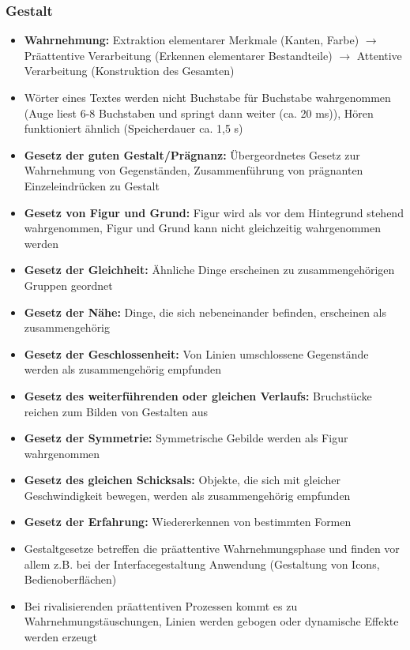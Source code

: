\documentclass[12pt,landscape]{article}
\begin{document}
\begin{multicols}{3}
\subsubsection{Gestalt}
\begin{itemize}
\item \textbf{Wahrnehmung:} Extraktion elementarer Merkmale (Kanten, Farbe) $\rightarrow$ Präattentive Verarbeitung (Erkennen elementarer Bestandteile) $\rightarrow$ Attentive Verarbeitung (Konstruktion des Gesamten)
\item Wörter eines Textes werden nicht Buchstabe für Buchstabe wahrgenommen (Auge liest 6-8 Buchstaben und springt dann weiter (ca. 20 ms)), Hören funktioniert ähnlich (Speicherdauer ca. 1,5 s)
\item \textbf{Gesetz der guten Gestalt/Prägnanz:} Übergeordnetes Gesetz zur Wahrnehmung von Gegenständen, Zusammenführung von prägnanten Einzeleindrücken zu Gestalt
\item \textbf{Gesetz von Figur und Grund:} Figur wird als vor dem Hintegrund stehend wahrgenommen, Figur und Grund kann nicht gleichzeitig wahrgenommen werden
\item \textbf{Gesetz der Gleichheit:} Ähnliche Dinge erscheinen zu zusammengehörigen Gruppen geordnet
\item \textbf{Gesetz der Nähe:} Dinge, die sich nebeneinander befinden, erscheinen als zusammengehörig
\item \textbf{Gesetz der Geschlossenheit:} Von Linien umschlossene Gegenstände werden als zusammengehörig empfunden
\item \textbf{Gesetz des weiterführenden oder gleichen Verlaufs:} Bruchstücke reichen zum Bilden von Gestalten aus
\item \textbf{Gesetz der Symmetrie:} Symmetrische Gebilde werden als Figur wahrgenommen
\item \textbf{Gesetz des gleichen Schicksals:} Objekte, die sich mit gleicher Geschwindigkeit bewegen, werden als zusammengehörig empfunden
\item \textbf{Gesetz der Erfahrung:} Wiedererkennen von bestimmten Formen
\item Gestaltgesetze betreffen die präattentive Wahrnehmungsphase und finden vor allem z.B. bei der Interfacegestaltung Anwendung (Gestaltung von Icons, Bedienoberflächen)
\item Bei rivalisierenden präattentiven Prozessen kommt es zu Wahrnehmungstäuschungen, Linien werden gebogen oder dynamische Effekte werden erzeugt
\end{itemize}

\end{multicols}
\end{document}
